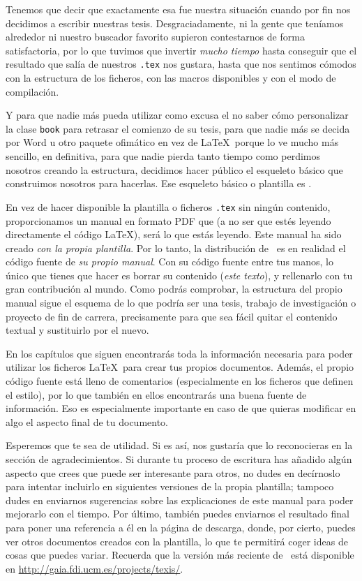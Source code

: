 Tenemos que decir que exactamente esa fue nuestra situación cuando por
fin nos decidimos a escribir nuestras tesis. Desgraciadamente, ni la
gente que teníamos alrededor ni nuestro buscador favorito supieron
contestarnos de forma satisfactoria, por lo que tuvimos que invertir
\emph{mucho tiempo} hasta conseguir que el resultado que salía de
nuestros \texttt{.tex} nos gustara, hasta que nos sentimos cómodos con
la estructura de los ficheros, con las macros disponibles y con el
modo de compilación.

Y para que nadie más pueda utilizar como excusa el no saber cómo
personalizar la clase \texttt{book} para retrasar el comienzo de su
tesis, para que nadie más se decida por Word u otro paquete ofimático
en vez de \LaTeX\ porque lo ve mucho más sencillo, en definitiva, para
que nadie pierda tanto tiempo como perdimos nosotros creando la
estructura, decidimos hacer público el esqueleto básico que
construimos nosotros para hacerlas. Ese esqueleto básico o plantilla
es \texis.

En vez de hacer disponible la plantilla o ficheros \texttt{.tex} sin
ningún contenido, proporcionamos un manual en formato PDF que (a no
ser que estés leyendo directamente el código \LaTeX), será lo que
estás leyendo. Este manual ha sido creado \emph{con la propia
  plantilla}. Por lo tanto, la distribución de \texis\ es en
realidad el código fuente de \emph{su propio manual}. Con su código
fuente entre tus manos, lo único que tienes que hacer es borrar su
contenido (\emph{este texto}), y rellenarlo con tu gran contribución
al mundo.  Como podrás comprobar, la estructura del propio manual
sigue el esquema de lo que podría ser una tesis, trabajo de
investigación o proyecto de fin de carrera, precisamente para que sea
fácil quitar el contenido textual y sustituirlo por el nuevo.

En los capítulos que siguen encontrarás toda la información necesaria
para poder utilizar los ficheros \LaTeX\ para crear tus propios
documentos. Además, el propio código fuente está lleno de comentarios
(especialmente en los ficheros que definen el estilo), por lo que
también en ellos encontrarás una buena fuente de información. Eso es
especialmente importante en caso de que quieras modificar en algo el
aspecto final de tu documento.

Esperemos que te sea de utilidad. Si es así, nos gustaría que lo
reconocieras en la sección de agradecimientos. Si durante tu proceso
de escritura has añadido algún aspecto que crees que puede ser
interesante para otros, no dudes en decírnoslo para intentar incluirlo
en siguientes versiones de la propia plantilla; tampoco dudes en
enviarnos sugerencias sobre las explicaciones de este manual para
poder mejorarlo con el tiempo. Por último, también puedes enviarnos el
resultado final para poner una referencia a él en la página de
descarga, donde, por cierto, puedes ver otros documentos creados con
la plantilla, lo que te permitirá coger ideas de cosas que puedes
variar. Recuerda que la versión más reciente de \texis\ está
disponible en \url{http://gaia.fdi.ucm.es/projects/texis/}.

